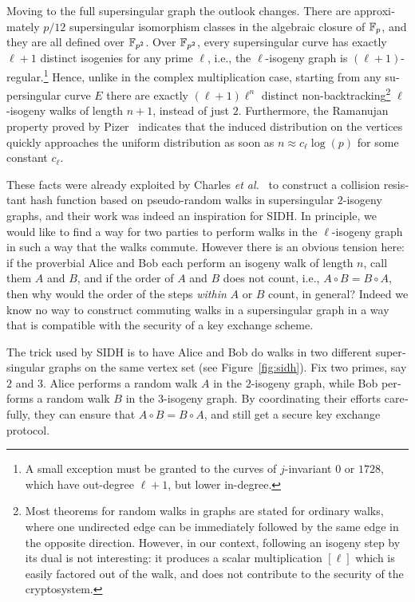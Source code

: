 \begin{otherlanguage}{english}
Moving to the full supersingular graph the outlook changes. There are
approximately $p/12$ supersingular isomorphism classes in the
algebraic closure of $\mathbb{F}_p$, and they are all defined over $\mathbb{F}_{p^2}$.
Over $\mathbb{F}_{p^2}$, every supersingular curve has exactly $\ell+1$
distinct isogenies for any prime $\ell$, i.e., the $\ell$-isogeny
graph is $(\ell+1)$-regular.\footnote{A small exception must be
  granted to the curves of $j$-invariant $0$ or $1728$, which have
  out-degree $\ell+1$, but lower in-degree.} Hence, unlike in the
complex multiplication case, starting from any supersingular curve $E$
there are exactly $(\ell+1)\ell^n$ distinct
non-backtracking\footnote{Most theorems for random walks in graphs are
  stated for ordinary walks, where one undirected edge can be
  immediately followed by the same edge in the opposite
  direction. However, in our context, following an isogeny step by its
  dual is not interesting: it produces a scalar multiplication
  $[\ell]$ which is easily factored out of the walk, and does not
  contribute to the security of the cryptosystem.} $\ell$-isogeny walks
of length $n+1$, instead of just $2$. Furthermore, the Ramanujan
property proved by Pizer~\cite{pizer1,pizer2} indicates that the
induced distribution on the vertices quickly approaches the uniform
distribution as soon as $n\approx c_\ell\log(p)$ for some constant
$c_\ell$.

These facts were already exploited by Charles \emph{et
  al.}~\cite{JC:ChaLauGor09} to construct a collision resistant hash
function based on pseudo-random walks in supersingular $2$-isogeny
graphs, and their work was indeed an inspiration for SIDH.  In
principle, we would like to find a way for two parties to perform
walks in the $\ell$-isogeny graph in such a way that the walks
commute. However there is an obvious tension here: if the proverbial
Alice and Bob each perform an isogeny walk of length $n$, call them
$A$ and $B$, and if the order of $A$ and $B$ does not count, i.e.,
$A\circ B=B\circ A$, then why would the order of the steps
\emph{within} $A$ or $B$ count, in general?  Indeed we know no way to
construct commuting walks in a supersingular graph in a way that is
compatible with the security of a key exchange scheme.

The trick used by SIDH is to have Alice and Bob do walks in two
different supersingular graphs on the same vertex set (see
Figure~\ref{fig:sidh}). Fix two primes, say $2$ and $3$. Alice
performs a random walk $A$ in the $2$-isogeny graph, while Bob
performs a random walk $B$ in the $3$-isogeny graph. By coordinating
their efforts carefully, they can ensure that $A\circ B = B\circ A$,
and still get a secure key exchange protocol.


\end{otherlanguage}
